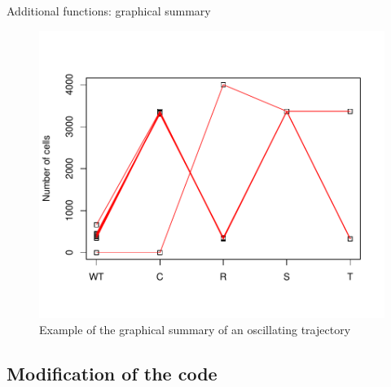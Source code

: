 \begin{frame}{Additional functions: graphical summary}
    \begin{figure}
    \centering
    \includegraphics[scale=0.55]{img/stripchart_example.pdf}
    \caption{Example of the graphical summary of an oscillating trajectory}
    \end{figure}
\end{frame}

\subsection{Modification of the code}

